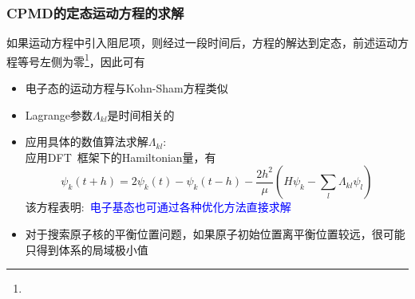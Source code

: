 \frame
{
	\frametitle{\textrm{CPMD}的定态运动方程的求解}
	如果运动方程中引入阻尼项，则经过一段时间后，方程的解达到定态，前述运动方程等号左侧为零\footnote{\fontsize{6.2pt}{5.2pt}\selectfont{定态，意味着波函数和原子位置不再随时间变化}}，因此可有
\begin{itemize}
	\item 电子态的运动方程与\textrm{Kohn-Sham}方程类似\\
		{\fontsize{6.2pt}{5.2pt}}
	\item \textrm{Lagrange}参数$\Lambda_{kl}$是时间相关的\\
		{\fontsize{6.2pt}{5.2pt}}
	\item 应用具体的数值算法求解$\Lambda_{kl}$:~\\
	{\fontsize{6.5pt}{5.2pt}\selectfont
	应用\textrm{DFT~}框架下的\textrm{Hamiltonian}量，有
	\begin{displaymath}
		\psi_k(t+h)=2\psi_k(t)-\psi_k(t-h)-\dfrac{2h^2}{\mu}(H\psi_k-\sum_l\Lambda_{kl}\psi_l)
	\end{displaymath}
	该方程表明:~\textcolor{blue}{电子基态也可通过各种优化方法直接求解}}\\
		{\fontsize{6.2pt}{5.2pt}}
	\item 对于搜索原子核的平衡位置问题，如果原子初始位置离平衡位置较远，很可能只得到体系的局域极小值\\
		{\fontsize{6.2pt}{5.2pt}\selectfont{使用模拟退火方法，使体系跃出局域极小点，搜索全局极小值}}
\end{itemize}
}

